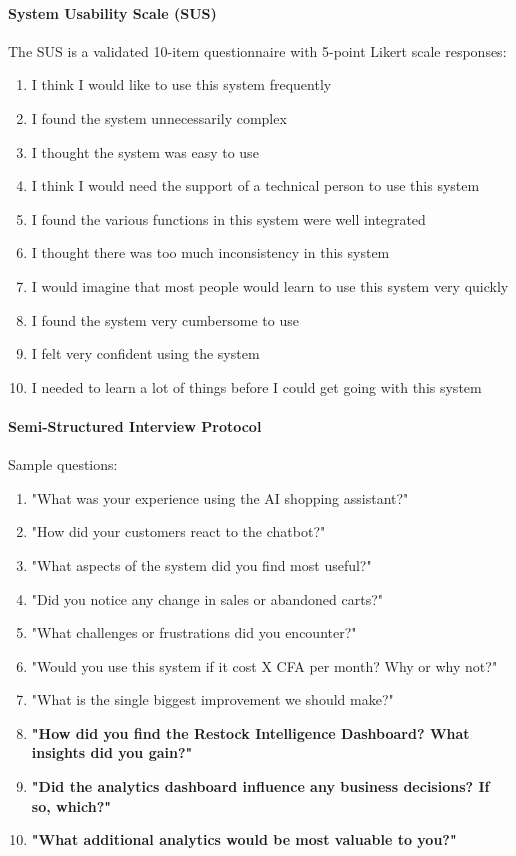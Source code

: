 \documentclass[12pt,a4paper]{article}
\begin{document}
\paragraph{System Usability Scale (SUS)}

The SUS \citep{brooke1996} is a validated 10-item questionnaire with 5-point Likert scale responses:

\begin{enumerate}
    \item I think I would like to use this system frequently
    \item I found the system unnecessarily complex
    \item I thought the system was easy to use
    \item I think I would need the support of a technical person to use this system
    \item I found the various functions in this system were well integrated
    \item I thought there was too much inconsistency in this system
    \item I would imagine that most people would learn to use this system very quickly
    \item I found the system very cumbersome to use
    \item I felt very confident using the system
    \item I needed to learn a lot of things before I could get going with this system
\end{enumerate}

\paragraph{Semi-Structured Interview Protocol}

Sample questions:

\begin{enumerate}
    \item "What was your experience using the AI shopping assistant?"
    \item "How did your customers react to the chatbot?"
    \item "What aspects of the system did you find most useful?"
    \item "Did you notice any change in sales or abandoned carts?"
    \item "What challenges or frustrations did you encounter?"
    \item "Would you use this system if it cost X CFA per month? Why or why not?"
    \item "What is the single biggest improvement we should make?"
    \item \textbf{"How did you find the Restock Intelligence Dashboard? What insights did you gain?"}
    \item \textbf{"Did the analytics dashboard influence any business decisions? If so, which?"}
    \item \textbf{"What additional analytics would be most valuable to you?"}
\end{enumerate}
\end{document}
